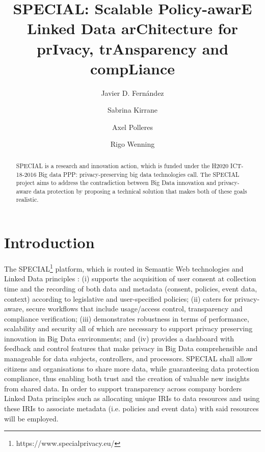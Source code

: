 \documentclass[runningheads,a4paper]{llncs}
\begin{document}
\mainmatter

\title{SPECIAL: Scalable Policy-awarE Linked Data arChitecture for prIvacy, trAnsparency and
 compLiance}
\author{Javier D. Fernández \and
Sabrina Kirrane \and
Axel Polleres \and
Rigo Wenning}
\maketitle

\begin{abstract}
SPECIAL is a research and innovation action, which is funded under the H2020
 ICT-18-2016 Big data PPP: privacy-preserving big data technologies call. The
 SPECIAL project aims to address the contradiction between Big Data innovation
 and privacy-aware data protection by proposing a technical solution that makes
 both of these goals realistic.

\end{abstract}


\section{Introduction}

The SPECIAL\footnote{https://www.specialprivacy.eu/} platform, which is routed in Semantic Web technologies and Linked Data principles  \cite{__RefHeading__354_1658379157}: (i) supports the acquisition
 of user consent at collection time and the recording of both data and metadata
 (consent, policies, event data, context) according to legislative and user-specified
 policies; (ii) caters for privacy-aware, secure workflows that include usage/access
 control, transparency and compliance verification; (iii) demonstrates robustness
 in terms of performance, scalability and security all of which are necessary to
 support privacy preserving innovation in Big Data environments; and (iv) provides a dashboard with feedback and control features that make privacy in Big
 Data comprehensible and manageable for data subjects, controllers, and processors. SPECIAL shall allow citizens and organisations to share more data, while
 guaranteeing data protection compliance, thus enabling both trust and the creation of valuable new insights from shared data. In order to support transparency
 across company borders Linked Data principles such as allocating unique IRIs
 to data resources and using these IRIs to associate metadata (i.e. policies and
 event data) with said resources will be employed.
\end{document}
